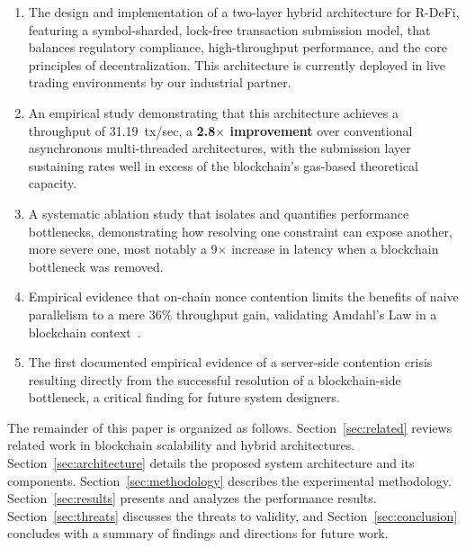 \begin{enumerate}
    \item The design and implementation of a two-layer hybrid architecture for R-DeFi, featuring a symbol-sharded, lock-free transaction submission model, that balances regulatory compliance, high-throughput performance, and the core principles of decentralization. This architecture is currently deployed in live trading environments by our industrial partner.
    \item An empirical study demonstrating that this architecture achieves a throughput of 31.19~tx/sec, a \textbf{2.8$\times$ improvement} over conventional asynchronous multi-threaded architectures, with the submission layer sustaining rates well in excess of the blockchain's gas-based theoretical capacity.
    \item A systematic ablation study that isolates and quantifies performance bottlenecks, demonstrating how resolving one constraint can expose another, more severe one, most notably a 9$\times$ increase in latency when a blockchain bottleneck was removed.
    \item Empirical evidence that on-chain nonce contention limits the benefits of naive parallelism to a mere 36\% throughput gain, validating Amdahl's Law in a blockchain context~\cite{amdahl1967validity}.
    \item The first documented empirical evidence of a server-side contention crisis resulting directly from the successful resolution of a blockchain-side bottleneck, a critical finding for future system designers.
\end{enumerate}

The remainder of this paper is organized as follows. Section~\ref{sec:related} reviews related work in blockchain scalability and hybrid architectures. Section~\ref{sec:architecture} details the proposed system architecture and its components. Section~\ref{sec:methodology} describes the experimental methodology. Section~\ref{sec:results} presents and analyzes the performance results. Section~\ref{sec:threats} discusses the threats to validity, and Section~\ref{sec:conclusion} concludes with a summary of findings and directions for future work.


